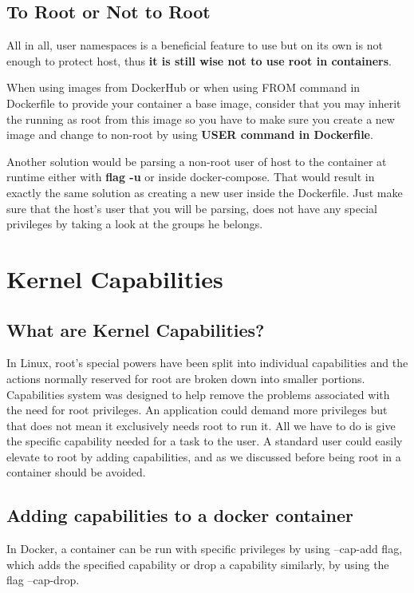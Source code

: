 \subsection{To Root or Not to Root}
All in all, user namespaces is a beneficial feature to use but on its own is not enough to protect host, thus \textbf{it is still wise not to use root in containers}.

\begin{mdframed}[backgroundcolor=navajowhite]
When using images from DockerHub or when using FROM command in Dockerfile to provide your container a base image, consider that you may inherit the running as root from this image so you have to make sure you create a new image and change to non-root by using \textbf{USER command in Dockerfile}.

Another solution would be parsing a non-root user of host to the container at runtime either with \textbf{flag -u} or inside docker-compose. That would result in exactly the same solution as creating a new user inside the Dockerfile. Just make sure that the host's user that you will be parsing, does not have any special privileges by taking a look at the groups he belongs.
\end{mdframed}

\section{Kernel Capabilities}
\subsection{What are Kernel Capabilities?}
In Linux, root's special powers have been split into individual capabilities and the actions normally reserved for root are broken down into smaller portions. Capabilities system was designed to help remove the problems associated with the need for root privileges. An application could demand more privileges but that does not mean it exclusively needs root to run it. All we have to do is give the specific capability needed for a task to the user. 
A standard user could easily elevate to root by adding capabilities, and as we discussed before being root in a container should be avoided.

\subsection{Adding capabilities to a docker container}
In Docker, a container can be run with specific privileges by using --cap-add flag, which adds the specified capability or drop a capability similarly, by using the flag --cap-drop.
 

